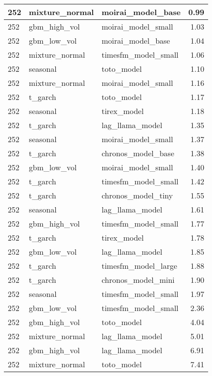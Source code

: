 {\begin{tabular}{lllr}
\midrule
252 & mixture\_normal & moirai\_model\_base & 0.99 \\
\midrule
252 & gbm\_high\_vol & moirai\_model\_small & 1.03 \\
\midrule
252 & gbm\_low\_vol & moirai\_model\_base & 1.04 \\
\midrule
252 & mixture\_normal & timesfm\_model\_small & 1.06 \\
\midrule
252 & seasonal & toto\_model & 1.10 \\
\midrule
252 & mixture\_normal & moirai\_model\_small & 1.16 \\
\midrule
252 & t\_garch & toto\_model & 1.17 \\
\midrule
252 & seasonal & tirex\_model & 1.18 \\
\midrule
252 & t\_garch & lag\_llama\_model & 1.35 \\
\midrule
252 & seasonal & moirai\_model\_small & 1.37 \\
\midrule
252 & t\_garch & chronos\_model\_base & 1.38 \\
\midrule
252 & gbm\_low\_vol & moirai\_model\_small & 1.40 \\
\midrule
252 & t\_garch & timesfm\_model\_small & 1.42 \\
\midrule
252 & t\_garch & chronos\_model\_tiny & 1.55 \\
\midrule
252 & seasonal & lag\_llama\_model & 1.61 \\
\midrule
252 & gbm\_high\_vol & timesfm\_model\_small & 1.77 \\
\midrule
252 & t\_garch & tirex\_model & 1.78 \\
\midrule
252 & gbm\_low\_vol & lag\_llama\_model & 1.85 \\
\midrule
252 & t\_garch & timesfm\_model\_large & 1.88 \\
\midrule
252 & t\_garch & chronos\_model\_mini & 1.90 \\
\midrule
252 & seasonal & timesfm\_model\_small & 1.97 \\
\midrule
252 & gbm\_low\_vol & timesfm\_model\_small & 2.36 \\
\midrule
252 & gbm\_high\_vol & toto\_model & 4.04 \\
\midrule
252 & mixture\_normal & lag\_llama\_model & 5.01 \\
\midrule
252 & gbm\_high\_vol & lag\_llama\_model & 6.91 \\
\midrule
252 & mixture\_normal & toto\_model & 7.41 \\
\bottomrule
\end{tabular}
}